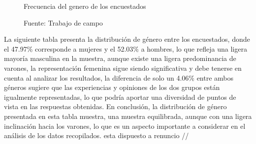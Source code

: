 \documentclass{article}\usepackage[]{graphicx}\usepackage[table]{xcolor}
\makeatletter
\newenvironment{kframe}{%
 \def\at@end@of@kframe{}%
 \ifinner\ifhmode%
  \def\at@end@of@kframe{\end{minipage}}%
  \begin{minipage}{\columnwidth}%
 \fi\fi%
 \def\FrameCommand##1{\hskip\@totalleftmargin \hskip-\fboxsep
 \colorbox{shadecolor}{##1}\hskip-\fboxsep
     \hskip-\linewidth \hskip-\@totalleftmargin \hskip\columnwidth}%
 \MakeFramed {\advance\hsize-\width
   \@totalleftmargin\z@ \linewidth\hsize
   \@setminipage}}%
 {\par\unskip\endMakeFramed%
 \at@end@of@kframe}
\newenvironment{knitrout}{}{} %
\makeatother
\begin{document}
\begin{figure}[H]
  \centering
  \caption{Frecuencia del genero de los encuestados}
\begin{knitrout}
\color{fgcolor}\begin{kframe}


{\ttfamily\noindent\bfseries{}}

{\ttfamily\noindent{}}

{\ttfamily\noindent\bfseries{}}

{\ttfamily\noindent\bfseries\color{errorcolor}{\#\# Error: objeto 'datos' no encontrado}}

{\ttfamily\noindent\bfseries\color{errorcolor}{\#\# Error: objeto 'datos' no encontrado}}

{\ttfamily\noindent\bfseries\color{errorcolor}{\#\# Error: objeto 'datos' no encontrado}}

{\ttfamily\noindent\bfseries\color{errorcolor}{\#\# Error: objeto 'graph1' no encontrado}}\end{kframe}
\end{knitrout}
  \caption*{Fuente: Trabajo de campo}
\end{figure}
La siguiente tabla  presenta la distribución de género entre los encuestados, donde el 47.97\% corresponde a mujeres y el 52.03\% a hombres, lo que refleja una ligera mayoría masculina en la muestra, aunque existe una ligera predominancia de varones, la representación femenina sigue siendo significativa y debe tenerse en cuenta al analizar los resultados, la diferencia de solo un 4.06\% entre ambos géneros sugiere que las experiencias y opiniones de los dos grupos están igualmente representadas, lo que podría aportar una diversidad de puntos de vista en las respuestas obtenidas. En conclusión, la distribución de género presentada en esta tabla muestra, una muestra equilibrada, aunque con una ligera inclinación hacia los varones, lo que es un aspecto importante a considerar en el análisis de los datos recopilados.
esta dispuesto a renuncio //
\end{document}
